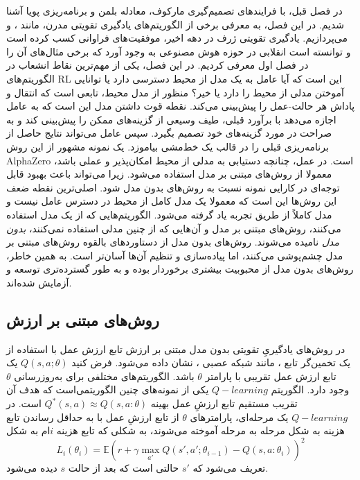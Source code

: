 
در فصل قبل، با فرایند‌های تصمیم‌گیری مارکوف، معادله بلمن و برنامه‌ریزی پویا آشنا شدیم. در این فصل، به معرفی برخی از الگوریتم‌های یادگیری تقویتی مدرن، مانند
،
 و 
  می‌پردازیم. یادگیری تقویتی ژرف در دهه اخیر، موفقیت‌های فراوانی کسب کرده است و توانسته است انقلابی در حوزه هوش مصنوعی به وجود آورد که برخی مثال‌های آن را در فصل اول معرفی کردیم. در این فصل، 
یکی از مهم‌ترین نقاط انشعاب در الگوریتم‌‌های RL این است که آیا عامل به یک مدل از محیط دسترسی دارد یا  توانایی آموختن مدلی از محیط را دارد یا خیر؟ منظور از مدل محیط، تابعی است که انتقال و پاداش هر حالت-عمل را پیش‌بینی می‌کند.
نقطه قوت داشتن مدل این است که به عامل اجازه می‌دهد با برآورد قبلی، طیف وسیعی از گزینه‌های ممکن را پیش‌بینی کند و به صراحت در مورد گزینه‌های خود تصمیم بگیرد. سپس عامل می‌تواند نتایج حاصل از برنامه‌ریزی قبلی را در قالب یک خط‌مشی بیاموزد. یک نمونه مشهور از این روش 
AlphaZero است. در عمل، چنانچه دستیابی به مدلی از محیط امکان‌پذیر و عملی باشد، معمولا از روش‌های مبتنی بر مدل استفاده می‌شود. زیرا می‌تواند باعث بهبود قابل توجه‌ای در کارایی نمونه نسبت به روش‌های بدون مدل شود. اصلی‌ترین نقطه ضعف این روش‌ها این است که معمولا یک مدل کامل از محیط  در دسترس عامل نیست و مدل کاملاً از طریق تجربه یاد گرفته می‌شود. الگوریتم‌هایی که از یک مدل استفاده می‌کنند، روش‌های مبتنی بر مدل و آن‌هایی که از چنین مدلی استفاده نمی‌کنند، \textit{بدون مدل} نامیده می‌شوند. روش‌های بدون مدل از دستاوردهای بالقوه روش‌های مبتنی بر مدل چشم‌پوشی می‌کنند‌، اما پیاده‌سازی و تنظیم آن‌ها آسان‌تر است. به همین خاطر، روش‌های بدون مدل از محبوبیت بیشتری برخوردار بوده و به طور گسترده‌تری توسعه و آزمایش شده‌اند.

\subsection{روش‌های مبتنی بر ارزش}


در روش‌های یادگیریِ تقویتی بدون مدل مبتنی بر ارزش
تابع ارزش عمل با استفاده از  یک تخمین‌گر تابع
 ، مانند شبکه عصبی ، نشان داده می‌شود. فرض کنید
$Q(s,a;\theta)$
یک تابع ارزش عمل تقریبی با پارامتر  
$\theta$ 
باشد.
الگوریتم‌های مختلفی برای به‌روزرسانی $\theta$ وجود دارد.
الگوریتم $ Q-learning$ یکی از نمونه‌های چنین الگوریتمی‌است
که هدف آن تقریب مستقیم تابع ارزشِ عمل بهینه 
$Q^*(s,a) \approx Q(s,a: \theta)$
 است. در $ Q-learning$ یک مرحله‌ای، پارامترهای $\theta$ از تابع ارزشِ عمل با به حداقل رساندن تابع هزینه به شکل مرحله به مرحله آموخته می‌شوند، به شکلی که تابع هزینه $i$ام به شکل 
$$L_i(\theta_i) = \mathbb{E} {\left( r+\gamma \max_{a'} Q(s',a'; \theta_{i-1})- Q(s,a:\theta_i) \right)}^2$$
 تعریف می‌شود که 
 $s'$
 حالتی است که بعد از حالت $s$ دیده می‌شود.
